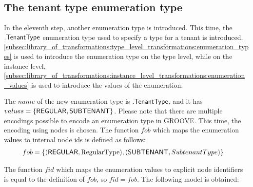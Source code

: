 \subsection{The tenant type enumeration type}
\label{sec:application:building_the_model:the_tenant_type_enumeration_type}

In the eleventh step, another enumeration type is introduced. This time, the $.\mathsf{TenantType}$ enumeration type used to specify a type for a tenant is introduced. \cref{subsec:library_of_transformations:type_level_transformations:enumeration_types} is used to introduce the enumeration type on the type level, while on the instance level, \cref{subsec:library_of_transformations:instance_level_transformations:enumeration_values} is used to introduce the values of the enumeration.

The $name$ of the new enumeration type is $.\mathsf{TenantType}$, and it has $values = \{\mathsf{REGULAR}, \mathsf{SUBTENANT}\}$. Please note that there are multiple encodings possible to encode an enumeration type in GROOVE. This time, the encoding using nodes is chosen. The function $fob$ which maps the enumeration values to internal node ids is defined as follows:
\begin{align*}
    fob = \{&(\mathsf{REGULAR}, \text{RegularType}), (\mathsf{SUBTENANT}, SubtenantType)\}
\end{align*}

The function $fid$ which maps the enumeration values to explicit node identifiers is equal to the definition of $fob$, so $fid = fob$. The following model is obtained:



